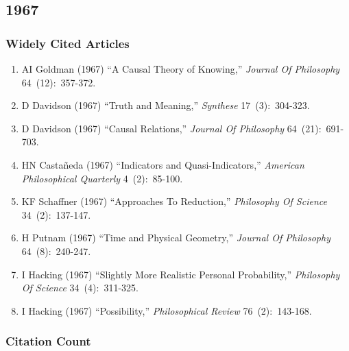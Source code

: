 \documentclass[
  10pt,
  letterpaper,
  DIV=11,
  numbers=noendperiod,
  twoside]{scrartcl}
\providecommand{\tightlist}{%
  \setlength{\itemsep}{0pt}\setlength{\parskip}{0pt}}\usepackage{longtable,booktabs,array}
\begin{document}
\newpage

\subsection{1967}\label{sec-s1967}

\subsubsection*{Widely Cited Articles}\label{widely-cited-articles-11}

\begin{enumerate}
\def\labelenumi{\arabic{enumi}.}
\tightlist
\item
  AI Goldman (1967) ``A Causal Theory of Knowing,'' \emph{Journal Of
  Philosophy} 64~(12):~357-372.
\item
  D Davidson (1967) ``Truth and Meaning,'' \emph{Synthese}
  17~(3):~304-323.
\item
  D Davidson (1967) ``Causal Relations,'' \emph{Journal Of Philosophy}
  64~(21):~691-703.
\item
  HN Castañeda (1967) ``Indicators and Quasi-Indicators,''
  \emph{American Philosophical Quarterly} 4~(2):~85-100.
\item
  KF Schaffner (1967) ``Approaches To Reduction,'' \emph{Philosophy Of
  Science} 34~(2):~137-147.
\item
  H Putnam (1967) ``Time and Physical Geometry,'' \emph{Journal Of
  Philosophy} 64~(8):~240-247.
\item
  I Hacking (1967) ``Slightly More Realistic Personal Probability,''
  \emph{Philosophy Of Science} 34~(4):~311-325.
\item
  I Hacking (1967) ``Possibility,'' \emph{Philosophical Review}
  76~(2):~143-168.
\end{enumerate}

\subsubsection*{Citation Count}\label{sec-count-1967}
\end{document}
